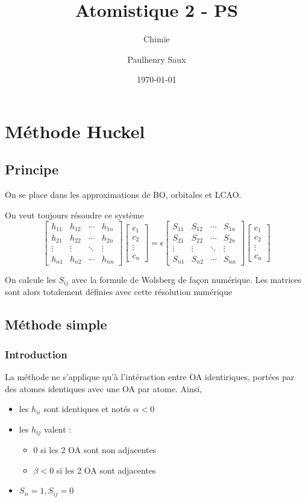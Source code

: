 \documentclass[french]{yLectureNote}
\title{Atomistique 2 - PS}
\subtitle{Chimie}
\author{Paulhenry Saux}
\date{\today}
\begin{document}
\setcounter{chapter}{2}
\chapter{Méthode Huckel}
\section{Principe}
On se place dans les approximations de BO, orbitales et LCAO.

On veut toujours résoudre ce système
\[
\begin{bmatrix}
h_{11} & h_{12} & \cdots & h_{1n} \\
h_{21} & h_{22} & \cdots & h_{2n} \\
\vdots & \vdots & \ddots & \vdots \\
h_{n1} & h_{n2} & \cdots & h_{nn}
\end{bmatrix}
\begin{bmatrix}
c_1 \\
c_2 \\
\vdots \\
c_n
\end{bmatrix}
= \epsilon
\begin{bmatrix}
S_{11} & S_{12} & \cdots & S_{1n} \\
S_{21} & S_{22} & \cdots & S_{2n} \\
\vdots & \vdots & \ddots & \vdots \\
S_{n1} & S_{n2} & \cdots & S_{nn}
\end{bmatrix}
\begin{bmatrix}
c_1 \\
c_2 \\
\vdots \\
c_n
\end{bmatrix}
\]

On calcule les \(S_{ij}\) avec la formule de Wolsberg de façon numérique. Les matrices sont alors totalement définies avec cette résolution numérique
\section{Méthode simple}
\subsection{Introduction}
La méthode ne s'applique qu'à l'intéraction entre OA identiriques, portées par des atomes identiques avec une OA par atome. Ainsi,
\begin{itemize}
 \item les \(h_{ii}\) sont identiques et notés \(\alpha < 0\)
 \item les \(h_{ij}\) valent :
 \begin{itemize}
  \item 0 si les 2 OA sont non adjacentes
  \item \(\beta <0\) si les 2 OA sont adjacentes
 \end{itemize}
\item \(S_{ii} = 1, S_{ij} = 0 \)
\end{itemize}
\end{document}
